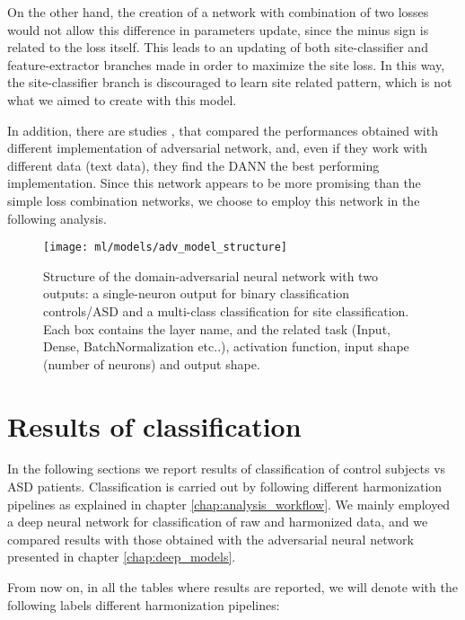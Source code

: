 \documentclass[11pt]{report}
\begin{document}
On the other hand, the creation of a network with combination of two losses would not allow this difference in parameters update, since the minus sign is related to the loss itself.
This leads to an updating of both site-classifier and feature-extractor branches made in order to maximize the site loss.
In this way, the site-classifier branch is discouraged to learn site related pattern, which is not what we aimed to create with this model.

In addition, there are studies \cite{kamath2019}, that compared the performances obtained with different implementation of adversarial network, and, even if they work with different data (text data), they find the DANN the best performing implementation.
Since this network appears to be more promising than the simple loss combination networks, we choose to employ this network in the following analysis.




\begin{figure}[h!]
\centering
\texttt{[image: ml/models/adv\_model\_structure]}
\caption{Structure of the domain-adversarial neural network with two outputs: a single-neuron output for binary classification controls/ASD and a multi-class classification for site classification.
Each box contains the layer name, and the related task (Input, Dense, BatchNormalization etc..), activation function, input shape (number of neurons) and output shape.
}
\label{fig:adv_model_structure}
\end{figure}


\newpage
\chapter{Results of classification} \label{chap:results_deeplearning}
In the following sections we report results of classification of control subjects vs ASD patients.
Classification is carried out by following different harmonization pipelines as explained in chapter \ref{chap:analysis_workflow}.
We mainly employed a deep neural network for classification of raw and harmonized data, and we compared results with those obtained with the adversarial neural network presented in chapter \ref{chap:deep_models}.

From now on, in all the tables where results are reported, we will denote with the following labels different harmonization pipelines:
\end{document}
